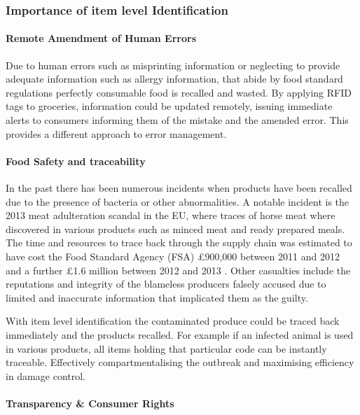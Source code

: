 \documentclass[a4paper, 11pt]{article}
\begin{document}
\vspace{\baselineskip}
\vspace{\baselineskip}
\vspace{\baselineskip}

\subsubsection{Importance of item level Identification}

\paragraph{Remote Amendment of Human Errors}
Due to human errors such as misprinting information or neglecting to provide adequate information such as allergy information, that abide by food standard regulations perfectly consumable food is recalled and wasted.\cite{FDA} By applying RFID tags to groceries, information could be updated remotely, issuing immediate alerts to consumers informing them of the mistake and the amended error. This provides a different approach to error management.

\paragraph{Food Safety and traceability}
In the past there has been numerous incidents when products have been recalled due to the presence of bacteria or other abnormalities. A notable incident is the 2013 meat adulteration scandal in the EU, where traces of horse meat where discovered in various products such as minced meat and ready prepared meals. The time and resources to trace back through the supply chain was estimated to have cost the Food Standard Agency (FSA) \pounds900,000 between 2011 and 2012 and a further \pounds1.6 million between 2012 and 2013 \cite{FSA}. Other casualties include the reputations and integrity of the blameless producers falsely accused due to limited and inaccurate information that implicated them as the guilty.\cite{horsy}

With item level identification the contaminated produce could be traced back immediately and the products recalled.\cite{rfidFood}\cite{rfidFood2} For example if an infected animal is used in various products, all items holding that particular code can be instantly traceable. Effectively compartmentalising the outbreak and maximising efficiency in damage control.

\paragraph{Transparency \& Consumer Rights}
\end{document}
